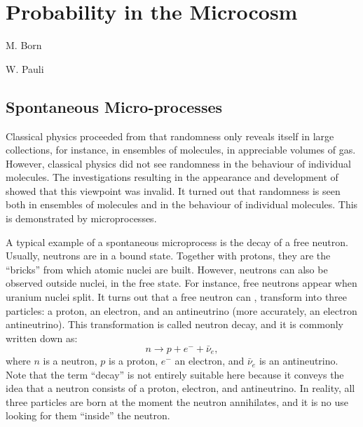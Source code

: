 \chapter{Probability in the Microcosm}
\begin{epigraphs}
 {M. Born}

\vspace{10pt}

  {W. Pauli}
\end{epigraphs}


\section{Spontaneous Micro-processes}

Classical physics proceeded from that randomness only reveals itself in
large collections, for instance, in ensembles of molecules, in appreciable
volumes of gas. However, classical physics did not see randomness in
the behaviour of individual molecules. The investigations resulting in the
appearance and development of  showed that this
viewpoint was invalid. It turned out that randomness is seen both in
ensembles of molecules and in the behaviour of individual molecules.
This is demonstrated by  microprocesses.

 A typical example of a spontaneous microprocess is
the decay of a free neutron. Usually, neutrons are in a bound state.
Together with protons, they are the ``bricks'' from which atomic nuclei
are built. However, neutrons can also be observed outside nuclei, in the
free state. For instance, free neutrons appear when uranium nuclei split.
It turns out that a free neutron can , transform into three particles: a proton, an electron, and an
antineutrino (more accurately, an electron antineutrino). This
transformation is called neutron decay, and it is commonly written
down as:
\begin{equation*}%
n \to p + e^{-} + \bar{\nu}_{e},
\end{equation*}
where $n$ is a neutron, $p$ is a proton, $e^{-}$ an electron, and $\bar{\nu}_{e}$ is an antineutrino. Note that the term ``decay'' is not entirely suitable here because it conveys the idea that a neutron consists of a proton, electron, and antineutrino. In reality, all three particles are born at the moment the neutron annihilates, and it is no use looking for them ``inside'' the neutron.

